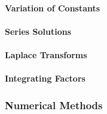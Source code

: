 


\paragraph{Variation of Constants}


\paragraph{Series Solutions}

\paragraph{Laplace Transforms}

\paragraph{Integrating Factors}










\subsubsection{Numerical Methods}

